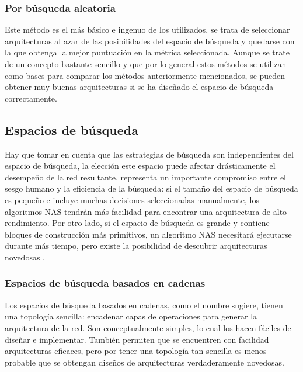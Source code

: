 \subsubsection{Por búsqueda aleatoria}
Este método es el más básico e ingenuo de los utilizados, se trata de seleccionar arquitecturas al azar de las posibilidades del espacio de búsqueda y quedarse con la que obtenga la mejor puntuación en la métrica seleccionada. Aunque se trate de un concepto bastante sencillo y que por lo general estos métodos se utilizan como bases para comparar los métodos anteriormente mencionados, se pueden obtener muy buenas arquitecturas si se ha diseñado el espacio de búsqueda correctamente.

\subsection{Espacios de búsqueda}
Hay que tomar en cuenta que las estrategias de búsqueda son independientes del espacio de búsqueda, la elección este espacio puede afectar drásticamente el desempeño de la red resultante, representa un importante compromiso entre el sesgo humano y la eficiencia de la búsqueda: si el tamaño del espacio de búsqueda es pequeño e incluye muchas decisiones seleccionadas manualmente, los algoritmos NAS tendrán más facilidad para encontrar una arquitectura de alto rendimiento. Por otro lado, si el espacio de búsqueda es grande y contiene bloques de construcción más primitivos, un algoritmo NAS necesitará ejecutarse durante más tiempo, pero existe la posibilidad de descubrir arquitecturas novedosas \cite{white_neural_2023}.

\subsubsection{Espacios de búsqueda basados en cadenas}
Los espacios de búsqueda basados en cadenas, como el nombre sugiere, tienen una topología sencilla: encadenar capas de operaciones para generar la arquitectura de la red. Son conceptualmente simples, lo cual los hacen fáciles de diseñar e implementar. También permiten que se encuentren con facilidad arquitecturas eficaces, pero por tener una topología tan sencilla es menos probable que se obtengan diseños de arquitecturas verdaderamente novedosas.

